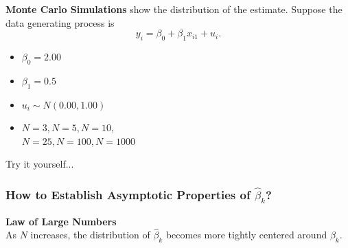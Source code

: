 \documentclass[a4paper,12pt]{article}
\begin{document}
\textbf{Monte Carlo Simulations} show the distribution of the estimate.
Suppose the data generating process is
$$y_i = \beta_0 + \beta_1 x_{i1} + u_{i}.$$

\begin{multicols}{2}  %

    \begin{itemize}
        \item $\beta_0 = 2.00$
        \item $\beta_1 = 0.5$
        \item $u_i \sim N(0.00, 1.00)$
        \item $N=3, N=5, N=10,$\\ $N=25, N=100, N=1000$
    \end{itemize}

    \columnbreak  %
\vspace*{1cm}
    Try it yourself...

\end{multicols}  %
\clearpage

\subsubsection*{How to Establish Asymptotic Properties of $\hat{\beta}_k$?}
%

    \textbf{Law of Large Numbers}\\
    As $N$ increases, the distribution of $\hat{\beta}_k$ becomes more tightly centered around $\beta_k$.

    \
\end{document}
